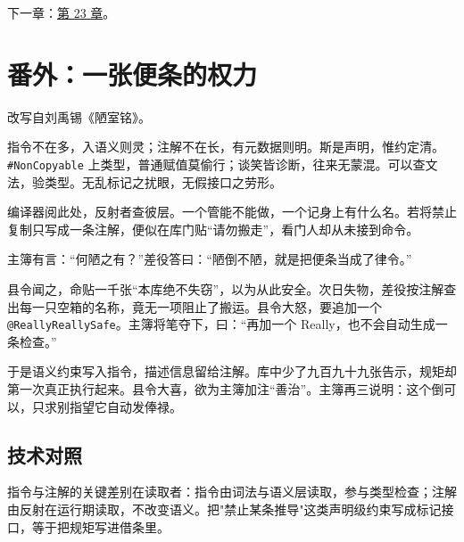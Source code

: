 下一章：\hyperref[ch:23]{第 23 章}。

\section{番外：一张便条的权力}

改写自刘禹锡《陋室铭》。

指令不在多，入语义则灵；注解不在长，有元数据则明。斯是声明，惟约定清。\texttt{\#Non\allowbreak{}Copyable} 上类型，普通赋值莫偷行；谈笑皆诊断，往来无蒙混。可以查文法，验类型。无乱标记之扰眼，无假接口之劳形。

编译器阅此处，反射者查彼层。一个管能不能做，一个记身上有什么名。若将禁止复制只写成一条注解，便似在库门贴“请勿搬走”，看门人却从未接到命令。

主簿有言：“何陋之有？”差役答曰：“陋倒不陋，就是把便条当成了律令。”

县令闻之，命贴一千张“本库绝不失窃”，以为从此安全。次日失物，差役按注解查出每一只空箱的名称，竟无一项阻止了搬运。县令大怒，要追加一个 \texttt{@Really\allowbreak{}Really\allowbreak{}Safe}。主簿将笔夺下，曰：“再加一个 Really，也不会自动生成一条检查。”

于是语义约束写入指令，描述信息留给注解。库中少了九百九十九张告示，规矩却第一次真正执行起来。县令大喜，欲为主簿加注“善治”。主簿再三说明：这个倒可以，只求别指望它自动发俸禄。

\subsection*{技术对照}

指令与注解的关键差别在读取者：指令由词法与语义层读取，参与类型检查；注解由反射在运行期读取，不改变语义。把"禁止某条推导"这类声明级约束写成标记接口，等于把规矩写进借条里。
